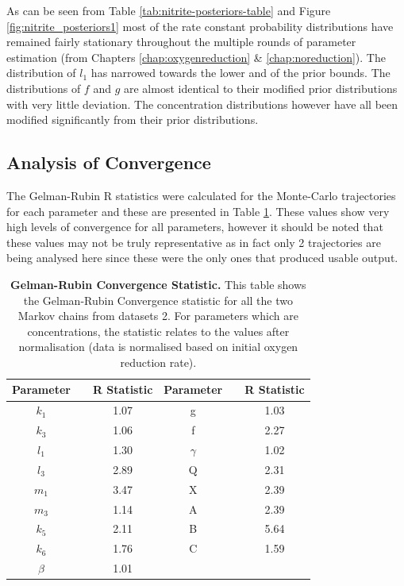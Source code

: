 As can be seen from Table \ref{tab:nitrite-posteriors-table} and Figure \ref{fig:nitrite_posteriors1} most of the rate constant probability distributions have remained fairly stationary throughout the multiple rounds of parameter estimation (from Chapters \ref{chap:oxygenreduction} \& \ref{chap:noreduction}). The distribution of $l_1$ has narrowed towards the lower and of the prior bounds. The distributions of $f$ and $g$ are almost identical to their modified prior distributions with very little deviation. The concentration distributions however have all been modified significantly from their prior distributions.

\subsection{Analysis of Convergence}
The Gelman-Rubin R statistics were calculated for the Monte-Carlo trajectories for each parameter and these are presented in Table \ref{tab:nitrite-r-stat}. These values show very high levels of convergence for all parameters, however it should be noted that these values may not be truly representative as in fact only 2 trajectories are being analysed here since these were the only ones that produced usable output.

\begin{table}[tbp]%
\renewcommand{\arraystretch}{1.5}
\begin{center}
\begin{tabular}{ccc|ccc}
\toprule
\textbf{Parameter} && \textbf{R Statistic} & \textbf{Parameter} && \textbf{R Statistic}\\
\midrule
$k_1$ && 1.07 & g && 1.03\\
$k_3$ && 1.06 & f && 2.27\\
$l_1$ && 1.30 & $\gamma$ && 1.02\\
$l_3$ && 2.89 & Q && 2.31\\
$m_1$ && 3.47 & X && 2.39\\
$m_3$ && 1.14 & A && 2.39\\
$k_5$ && 2.11 & B && 5.64\\
$k_6$ && 1.76 & C && 1.59\\
$\beta$ && 1.01\\
\bottomrule
\end{tabular}
\end{center}
\caption[Gelman-Rubin Convergence Statistic]{{\bf Gelman-Rubin Convergence Statistic.} This table shows the Gelman-Rubin Convergence statistic for all the two Markov chains from datasets 2. For parameters which are concentrations, the statistic relates to the values after normalisation (data is normalised based on initial oxygen reduction rate).
\label{tab:nitrite-r-stat}}
\end{table}

